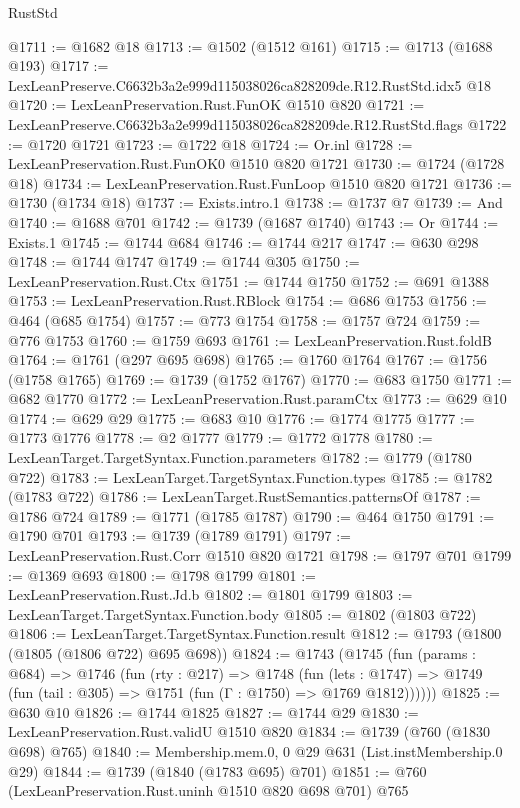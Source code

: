 \begin{lexlean}{RustStd}
\begin{coremodule}
@1711 := @1682 @18
@1713 := @1502 (@1512 @161)
@1715 := @1713 (@1688 @193)
@1717 := LexLeanPreserve.C6632b3a2e999d115038026ca828209de.R12.RustStd.idx5 @18
@1720 := LexLeanPreservation.Rust.FunOK @1510 @820
@1721 := LexLeanPreserve.C6632b3a2e999d115038026ca828209de.R12.RustStd.flags
@1722 := @1720 @1721
@1723 := @1722 @18
@1724 := Or.inl
@1728 := LexLeanPreservation.Rust.FunOK0 @1510 @820 @1721
@1730 := @1724 (@1728 @18)
@1734 := LexLeanPreservation.Rust.FunLoop @1510 @820 @1721
@1736 := @1730 (@1734 @18)
@1737 := Exists.intro.{1}
@1738 := @1737 @7
@1739 := And
@1740 := @1688 @701
@1742 := @1739 (@1687 @1740)
@1743 := Or
@1744 := Exists.{1}
@1745 := @1744 @684
@1746 := @1744 @217
@1747 := @630 @298
@1748 := @1744 @1747
@1749 := @1744 @305
@1750 := LexLeanPreservation.Rust.Ctx
@1751 := @1744 @1750
@1752 := @691 @1388
@1753 := LexLeanPreservation.Rust.RBlock
@1754 := @686 @1753
@1756 := @464 (@685 @1754)
@1757 := @773 @1754
@1758 := @1757 @724
@1759 := @776 @1753
@1760 := @1759 @693
@1761 := LexLeanPreservation.Rust.foldB
@1764 := @1761 (@297 @695 @698)
@1765 := @1760 @1764
@1767 := @1756 (@1758 @1765)
@1769 := @1739 (@1752 @1767)
@1770 := @683 @1750
@1771 := @682 @1770
@1772 := LexLeanPreservation.Rust.paramCtx
@1773 := @629 @10
@1774 := @629 @29
@1775 := @683 @10
@1776 := @1774 @1775
@1777 := @1773 @1776
@1778 := @2 @1777
@1779 := @1772 @1778
@1780 := LexLeanTarget.TargetSyntax.Function.parameters
@1782 := @1779 (@1780 @722)
@1783 := LexLeanTarget.TargetSyntax.Function.types
@1785 := @1782 (@1783 @722)
@1786 := LexLeanTarget.RustSemantics.patternsOf
@1787 := @1786 @724
@1789 := @1771 (@1785 @1787)
@1790 := @464 @1750
@1791 := @1790 @701
@1793 := @1739 (@1789 @1791)
@1797 := LexLeanPreservation.Rust.Corr @1510 @820 @1721
@1798 := @1797 @701
@1799 := @1369 @693
@1800 := @1798 @1799
@1801 := LexLeanPreservation.Rust.Jd.b
@1802 := @1801 @1799
@1803 := LexLeanTarget.TargetSyntax.Function.body
@1805 := @1802 (@1803 @722)
@1806 := LexLeanTarget.TargetSyntax.Function.result
@1812 := @1793 (@1800 (@1805 (@1806 @722) @695 @698))
@1824 := @1743
    (@1745
      (fun (params : @684) =>
      @1746
        (fun (rty : @217) =>
        @1748
          (fun (lets : @1747) =>
          @1749 (fun (tail : @305) => @1751 (fun (Γ : @1750) => @1769 @1812))))))
@1825 := @630 @10
@1826 := @1744 @1825
@1827 := @1744 @29
@1830 := LexLeanPreservation.Rust.validU @1510 @820
@1834 := @1739 (@760 (@1830 @698) @765)
@1840 := Membership.mem.{0, 0} @29 @631 (List.instMembership.{0} @29)
@1844 := @1739 (@1840 (@1783 @695) @701)
@1851 := @760 (LexLeanPreservation.Rust.uninh @1510 @820 @698 @701) @765

\end{coremodule}
\end{lexlean}
